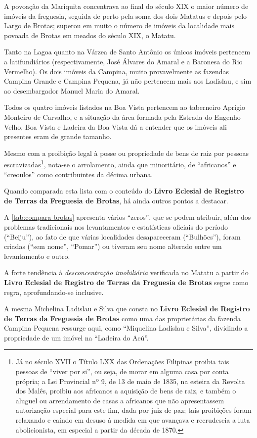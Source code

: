 

A povoação da Mariquita concentrava ao final do século XIX o maior número de imóveis da freguesia, seguida de perto pela soma dos dois Matatus e depois pelo Largo de Brotas; superou em muito o número de imóveis da localidade mais povoada de Brotas em meados do século XIX, o Matatu.

Tanto na Lagoa quanto na Várzea de Santo Antônio os únicos imóveis pertencem a latifundiários (respectivamente, José Álvares do Amaral e a Baronesa do Rio Vermelho). Os dois imóveis da Campina, muito provavelmente as fazendas Campina Grande e Campina Pequena, já não pertencem mais aos Ladislau, e sim ao desembargador Manuel Maria do Amaral.

Todos os quatro imóveis listados na Boa Vista pertencem ao taberneiro Aprígio Monteiro de Carvalho, e a situação da área formada pela Estrada do Engenho Velho, Boa Vista e Ladeira da Boa Vista dá a entender que os imóveis ali presentes eram de grande tamanho.

Mesmo com a proibição legal à posse ou propriedade de bens de raiz por pessoas escravizadas\footnote{Já no século XVII o Título LXX das Ordenações Filipinas proibia tais pessoas de ``viver por si'', ou seja, de morar em alguma casa por conta própria; a Lei Provincial nº 9, de 13 de maio de 1835, na esteira da Revolta dos Malês, proibiu aos africanos a aquisição de bens de raiz, e também o aluguel ou arrendamento de casas a africanos que não apresentassem autorização especial para este fim, dada por juiz de paz; tais proibições foram relaxando e caindo em desuso à medida em que avançava e recrudescia a luta abolicionista, em especial a partir da década de 1870.}, nota-se o arrolamento, ainda que minoritário, de ``africanos'' e ``creoulos'' como contribuintes da décima urbana.

Quando comparada esta lista com o conteúdo do \textbf{Livro Eclesial de Registro de Terras da Freguesia de Brotas}, há ainda outros pontos a destacar.



A \autoref{tab:compara-brotas} apresenta vários ``zeros'', que se podem atribuir, além dos problemas tradicionais nos levantamentos e estatísticas oficiais do período (``Beiju''), ao fato de que várias localidades desapareceram (``Bulhões''), foram criadas (``sem nome'', ``Pomar'') ou tiveram seu nome alterado entre um levantamento e outro.

A forte tendência à \textit{desconcentração imobiliária} verificada no Matatu a partir do \textbf{Livro Eclesial de Registro de Terras da Freguesia de Brotas} segue como regra, aprofundando-se inclusive. 

A mesma Michelina Ladislau e Silva que consta no \textbf{Livro Eclesial de Registro de Terras da Freguesia de Brotas} como uma das proprietárias da fazenda Campina Pequena ressurge aqui, como ``Miquelina Ladislau e Silva'', dividindo a propriedade de um imóvel na ``Ladeira do Acú''.